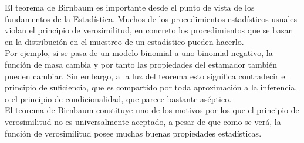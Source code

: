 \begin{observation}
El teorema de Birnbaum es importante desde el punto de vista de los fundamentos de la Estadística. Muchos de los procedimientos estadísticos usuales violan el principio de verosimilitud, en concreto los procedimientos que se basan en la distribución en el muestreo de un estadístico pueden hacerlo. \\

Por ejemplo, si se pasa de un modelo binomial a uno binomial negativo, la función de masa cambia y por tanto las propiedades del estamador también pueden cambiar. Sin embargo, a la luz del teorema esto significa contradecir el principio de suficiencia, que es compartido por toda aproximación a la inferencia, o el principio de condicionalidad, que parece bastante aséptico. \\

El teorema de Birnbaum constituye uno de los motivos por los que el principio de verosimilitud no es universalmente aceptado, a pesar de que como se verá, la función de verosimilitud posee muchas buenas propiedades estadísticas. 
\end{observation}

